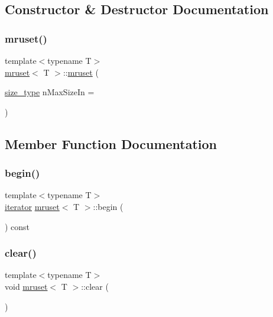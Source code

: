 \subsection{Constructor \& Destructor Documentation}
\mbox{\label{classmruset_a4474efd660e16337f91860587e369515}} 
\subsubsection{\texorpdfstring{mruset()}{mruset()}}
{\footnotesize\ttfamily template$<$typename T$>$ \\
\mbox{\hyperlink{classmruset}{mruset}}$<$ T $>$\+::\mbox{\hyperlink{classmruset}{mruset}} (\begin{DoxyParamCaption}\item[{\mbox{\hyperlink{classmruset_aaee46af18d8a5bdc503e9570e499a335}{size\+\_\+type}}}]{n\+Max\+Size\+In = {} }\end{DoxyParamCaption})\hspace{0.3cm}{\ttfamily [inline]}}



\subsection{Member Function Documentation}
\mbox{\label{classmruset_a778f8d3dc53ce8e76abb2f88ab42b3ad}} 
\subsubsection{\texorpdfstring{begin()}{begin()}}
{\footnotesize\ttfamily template$<$typename T$>$ \\
\mbox{\hyperlink{classmruset_a246172eda1afff45be47a013c14b1ad6}{iterator}} \mbox{\hyperlink{classmruset}{mruset}}$<$ T $>$\+::begin (\begin{DoxyParamCaption}{ }\end{DoxyParamCaption}) const\hspace{0.3cm}{\ttfamily [inline]}}

\mbox{\label{classmruset_ac7a85b54646e9d9d1962ce7f30b2a1fc}} 
\subsubsection{\texorpdfstring{clear()}{clear()}}
{\footnotesize\ttfamily template$<$typename T$>$ \\
void \mbox{\hyperlink{classmruset}{mruset}}$<$ T $>$\+::clear (\begin{DoxyParamCaption}{ }\end{DoxyParamCaption})\hspace{0.3cm}{\ttfamily [inline]}}

